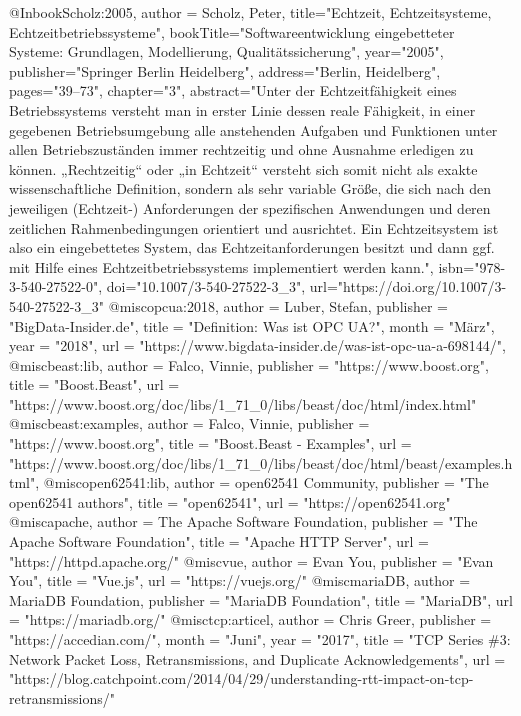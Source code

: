 @Inbook{Scholz:2005,
author = {Scholz, Peter},
title="Echtzeit, Echtzeitsysteme, Echtzeitbetriebssysteme",
bookTitle="Softwareentwicklung eingebetteter Systeme: Grundlagen, Modellierung, Qualit{\"a}tssicherung",
year="2005",
publisher="Springer Berlin Heidelberg",
address="Berlin, Heidelberg",
pages="39--73",
chapter="3",
abstract="Unter der Echtzeitf{\"a}higkeit eines Betriebssystems versteht man in erster Linie dessen reale F{\"a}higkeit, in einer gegebenen Betriebsumgebung alle anstehenden Aufgaben und Funktionen unter allen Betriebszust{\"a}nden immer rechtzeitig und ohne Ausnahme erledigen zu k{\"o}nnen. „Rechtzeitig`` oder „in Echtzeit`` versteht sich somit nicht als exakte wissenschaftliche Definition, sondern als sehr variable Gr{\"o}{\ss}e, die sich nach den jeweiligen (Echtzeit-) Anforderungen der spezifischen Anwendungen und deren zeitlichen Rahmenbedingungen orientiert und ausrichtet. Ein Echtzeitsystem ist also ein eingebettetes System, das Echtzeitanforderungen besitzt und dann ggf. mit Hilfe eines Echtzeitbetriebssystems implementiert werden kann.",
isbn="978-3-540-27522-0",
doi="10.1007/3-540-27522-3_3",
url="https://doi.org/10.1007/3-540-27522-3\_3"
}
@misc{opcua:2018,
  author = {Luber, Stefan},
  publisher = "BigData-Insider.de",
  title = "Definition: Was ist {OPC UA}?",
  month = "M{\"a}rz",
  year = "2018",
  url = "https://www.bigdata-insider.de/was-ist-opc-ua-a-698144/",
}
@misc{beast:lib,
  author = {Falco, Vinnie},
  publisher = "https://www.boost.org",
  title = "Boost.Beast",
  url = "https://www.boost.org/doc/libs/1\_71\_0/libs/beast/doc/html/index.html"
}
@misc{beast:examples,
  author = {Falco, Vinnie},
  publisher = "https://www.boost.org",
  title = "Boost.Beast - Examples",
  url = "https://www.boost.org/doc/libs/1\_71\_0/libs/beast/doc/html/beast/examples.html",
}
@misc{open62541:lib,
  author = {open62541 Community},
  publisher = "The open62541 authors",
  title = "open62541",
  url = "https://open62541.org"
}
@misc{apache,
  author = {The Apache Software Foundation},
  publisher = "The Apache Software Foundation",
  title = "Apache HTTP Server",
  url = "https://httpd.apache.org/"
}
@misc{vue,
  author = {Evan You},
  publisher = "Evan You",
  title = "Vue.js",
  url = "https://vuejs.org/"
}
@misc{mariaDB,
  author = {MariaDB Foundation},
  publisher = "MariaDB Foundation",
  title = "MariaDB",
  url = "https://mariadb.org/"
}
@misc{tcp:articel,
  author = {Chris Greer},
  publisher = "https://accedian.com/",
  month = "Juni",
  year = "2017",
  title = "TCP Series \#3: Network Packet Loss, Retransmissions, and Duplicate Acknowledgements",
  url = "https://blog.catchpoint.com/2014/04/29/understanding-rtt-impact-on-tcp-retransmissions/"
}
